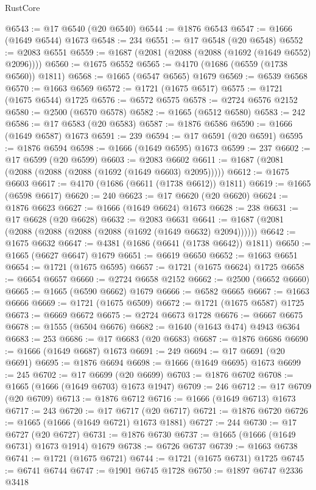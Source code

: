 \begin{lexlean}{RustCore}
\begin{coremodule}
@6543 := @17 @6540 (@20 @6540)
@6544 := @1876 @6543
@6547 := @1666 (@1649 @6544) @1673
@6548 := 234
@6551 := @17 @6548 (@20 @6548)
@6552 := @2083 @6551
@6559 := @1687 (@2081 (@2088 (@2088 (@1692 (@1649 @6552) @2096))))
@6560 := @1675 @6552
@6565 := @4170 (@1686 (@6559 (@1738 @6560)) @1811)
@6568 := @1665 (@6547 @6565) @1679
@6569 := @6539 @6568
@6570 := @1663 @6569
@6572 := @1721 (@1675 @6517)
@6575 := @1721 (@1675 @6544) @1725
@6576 := @6572 @6575
@6578 := @2724 @6576 @2152
@6580 := @2500 (@6570 @6578)
@6582 := @1665 (@6512 @6580)
@6583 := 242
@6586 := @17 @6583 (@20 @6583)
@6587 := @1876 @6586
@6590 := @1666 (@1649 @6587) @1673
@6591 := 239
@6594 := @17 @6591 (@20 @6591)
@6595 := @1876 @6594
@6598 := @1666 (@1649 @6595) @1673
@6599 := 237
@6602 := @17 @6599 (@20 @6599)
@6603 := @2083 @6602
@6611 := @1687 (@2081 (@2088 (@2088 (@2088 (@1692 (@1649 @6603) @2095)))))
@6612 := @1675 @6603
@6617 := @4170 (@1686 (@6611 (@1738 @6612)) @1811)
@6619 := @1665 (@6598 @6617)
@6620 := 240
@6623 := @17 @6620 (@20 @6620)
@6624 := @1876 @6623
@6627 := @1666 (@1649 @6624) @1673
@6628 := 238
@6631 := @17 @6628 (@20 @6628)
@6632 := @2083 @6631
@6641 := @1687 (@2081 (@2088 (@2088 (@2088 (@2088 (@1692 (@1649 @6632) @2094))))))
@6642 := @1675 @6632
@6647 := @4381 (@1686 (@6641 (@1738 @6642)) @1811)
@6650 := @1665 (@6627 @6647) @1679
@6651 := @6619 @6650
@6652 := @1663 @6651
@6654 := @1721 (@1675 @6595)
@6657 := @1721 (@1675 @6624) @1725
@6658 := @6654 @6657
@6660 := @2724 @6658 @2152
@6662 := @2500 (@6652 @6660)
@6665 := @1665 (@6590 @6662) @1679
@6666 := @6582 @6665
@6667 := @1663 @6666
@6669 := @1721 (@1675 @6509)
@6672 := @1721 (@1675 @6587) @1725
@6673 := @6669 @6672
@6675 := @2724 @6673 @1728
@6676 := @6667 @6675
@6678 := @1555 (@6504 @6676)
@6682 := @1640 (@1643 @474) @4943 @6364
@6683 := 253
@6686 := @17 @6683 (@20 @6683)
@6687 := @1876 @6686
@6690 := @1666 (@1649 @6687) @1673
@6691 := 249
@6694 := @17 @6691 (@20 @6691)
@6695 := @1876 @6694
@6698 := @1666 (@1649 @6695) @1673
@6699 := 245
@6702 := @17 @6699 (@20 @6699)
@6703 := @1876 @6702
@6708 := @1665 (@1666 (@1649 @6703) @1673 @1947)
@6709 := 246
@6712 := @17 @6709 (@20 @6709)
@6713 := @1876 @6712
@6716 := @1666 (@1649 @6713) @1673
@6717 := 243
@6720 := @17 @6717 (@20 @6717)
@6721 := @1876 @6720
@6726 := @1665 (@1666 (@1649 @6721) @1673 @1881)
@6727 := 244
@6730 := @17 @6727 (@20 @6727)
@6731 := @1876 @6730
@6737 := @1665 (@1666 (@1649 @6731) @1673 @1914) @1679
@6738 := @6726 @6737
@6739 := @1663 @6738
@6741 := @1721 (@1675 @6721)
@6744 := @1721 (@1675 @6731) @1725
@6745 := @6741 @6744
@6747 := @1901 @6745 @1728
@6750 := @1897 @6747 @2336 @3418

\end{coremodule}
\end{lexlean}
